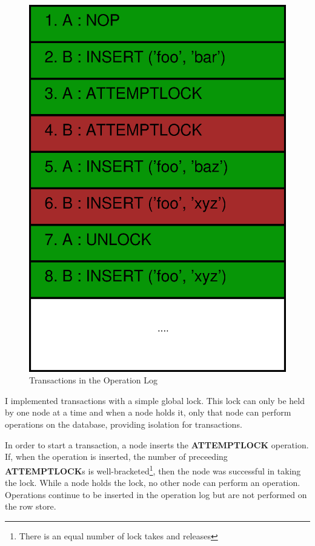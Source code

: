 \documentclass[12pt,twoside,notitlepage]{report}
\newcommand{\op}[1]  {{\bf #1}}         %
\begin{document}
\begin{figure}[htb]
\centering
\includegraphics[scale=0.5]{figs/op-log-trylock.eps}
\caption{\label{fig:op-log-trylock}Transactions in the Operation Log}
\end{figure}

I implemented transactions with a simple global lock. This lock can only be held by one node at a
time and when a node holds it, only that node can perform operations on the database, providing
isolation for transactions.

In order to start a transaction, a node inserts the \op{ATTEMPTLOCK} operation. If, when the
operation is inserted, the number of preceeding \op{ATTEMPTLOCK}s is well-bracketed\footnote{There
is an equal number of lock takes and releases}, then the node was successful in taking the lock.
While a node holds the lock, no other node can perform an operation. Operations continue to be inserted
in the operation log but are not performed on the row store.
\end{document}
